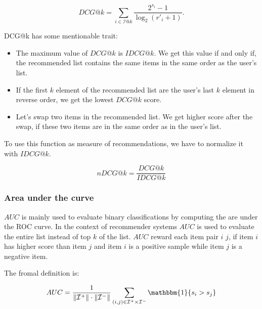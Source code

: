 $$ DCG@k=\sum_{i \in \mathcal{I}@k}\frac{2^{s_i}-1}{\log_2(r'_i+1)}.$$

DCG@k has some mentionable trait:
\begin{itemize}
\item The maximum value of $DCG@k$ is $IDCG@k$. We get this value if and only if, the
  recommended list contains the same items in the same order as the user's list.
\item If the first $k$ element of the recommended list are the user's last $k$ element in
  reverse order, we get the lowest $DCG@k$ score.
\item Let's swap two items in the recommended list. We get higher score after the
  swap, if these two items are in the same order as in the user's list.
\end{itemize}
To use this function as measure of recommendations, we have to normalize it with
$IDCG@k$.

$$nDCG@k=\frac{DCG@k}{IDCG@k}$$

\subsubsection{Area under the curve}
$AUC$ is mainly used to evaluate binary classifications by computing the are under
the ROC curve. In the context of recommender systems $AUC$ is used to evaluate the
entire list instead of top $k$ of the list. $AUC$ reward each item pair $i$ $j$, if
item $i$ has higher score than item $j$ and item $i$ is a positive sample while item
$j$ is a negative item.

The fromal definition is:

\[ AUC=\frac{1}{\|\mathcal{I}^{+}\|\cdot\|\mathcal{I}^-\|}
\sum_{(i,j)\in\mathcal{I}^+\times\mathcal{I}^-}\mathbbm{1} \{s_i > s_j \} \]



